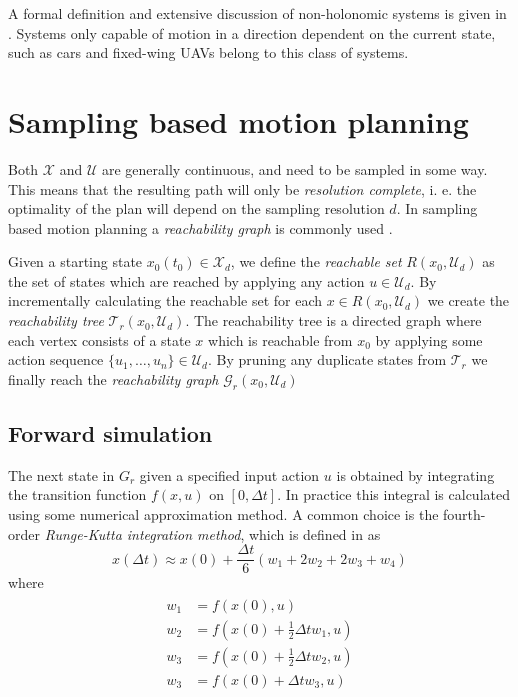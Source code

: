 A formal definition and extensive discussion of non-holonomic systems is given 
in \cite[Chapter~15]{planning_algorithms}. Systems only capable of motion in a direction 
dependent on the current state, such as cars and fixed-wing UAVs belong to this class of systems.

\section{Sampling based motion planning}
Both $\mathcal{X}$ and $\mathcal{U}$ are generally continuous, and need to be sampled 
in some way. This means that the resulting path will only be \textit{resolution complete}, i. e. 
the optimality of the plan will depend on the sampling resolution $d$. In sampling based
motion planning a \textit{reachability graph} is commonly used \cite{planning_algorithms}.

\begin{definition}\label{def:reach_graph}
    Given a starting state $x_0(t_0)\in\mathcal{X}_d$, we define the \textit{reachable set} 
    $R(x_0, \mathcal{U}_d)$ as the set of states which are reached by applying any action $u\in\mathcal{U}_d$.
    By incrementally calculating the reachable set for each $x\in R(x_0, \mathcal{U}_d)$ we create the \textit{reachability tree} $\mathcal{T}_r(x_0, \mathcal{U}_d)$.
    The reachability tree is a directed graph where each vertex consists of a state $x$ which is reachable from $x_0$ by applying some action sequence 
    $\{u_1,\hdots,u_n\}\in\mathcal{U}_d$. By pruning any duplicate states from $\mathcal{T}_r$ we finally reach the \textit{reachability graph} $\mathcal{G}_r(x_0, \mathcal{U}_d)$
\end{definition}

\subsection{Forward simulation}
The next state in $G_r$ given a specified input action $u$ is obtained by 
integrating the transition function $f(x, u)$ on $[0, \Delta t]$. In practice this 
integral is calculated using some numerical approximation method. A common choice is the 
fourth-order \textit{Runge-Kutta integration method}, which is defined in \cite{planning_algorithms} as
\begin{equation}
    x(\Delta t)\approx x(0) + \frac{\Delta t}{6}(w_1 + 2w_2 + 2w_3 + w_4)
\end{equation}
where
\begin{align}
\begin{split}
    w_1 &= f(x(0), u) \\
    w_2 &= f(x(0) + \frac{1}{2}\Delta t w_1, u) \\
    w_3 &= f(x(0) + \frac{1}{2}\Delta t w_2, u) \\
    w_3 &= f(x(0) + \Delta t w_3, u)
\end{split}
\end{align}

